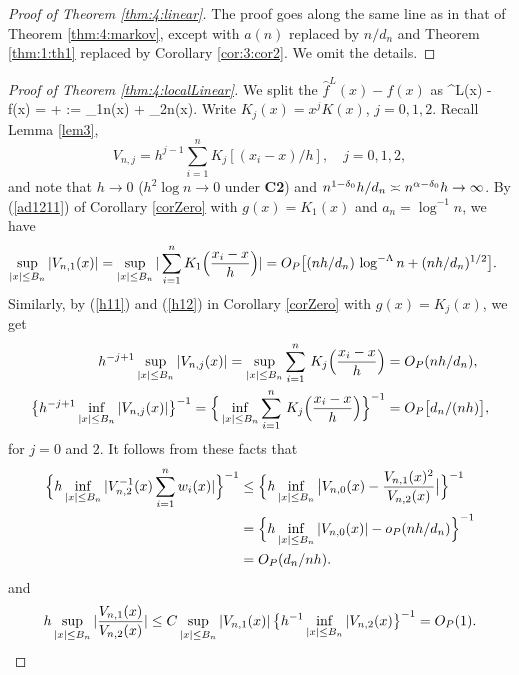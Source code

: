 \begin{proof}[Proof of Theorem \ref{thm:4:linear}]
The proof goes along the same line as in that of Theorem \ref{thm:4:markov}, except with $a(n)$ replaced by $n/d_n$ and Theorem \ref{thm:1:th1} replaced by Corollary \ref{cor:3:cor2}. We omit the details.
\end{proof}

\begin{proof}[Proof of Theorem \ref {thm:4:localLinear}]  We split the $\widehat{f}^L(x)-f(x)$ as
\be
{}^L(x) - f(x) =  +  := \Gamma_{1n}(x)  + \Gamma_{2n}(x). 
\ee
Write $K_j(x) = x^jK(x)$, $j = 0, 1, 2$. Recall Lemma \ref {lem3}, $$V_{n,j}=h^{j-1}
\sum_{i=1}^nK_j[(x_i-x)/h],\quad  j=0,1,2,$$
 and note that   $h\to 0$ ($h^2\log n\to 0$ under {\bf C2}) and $n^{1 - \delta_0} h / d_n \asymp n^{\alpha - \delta_0 } h \to \infty$.
  By (\ref{ad1211}) of Corollary \ref{corZero} with $g(x) = K_1(x)$ and $a_n = \log^{-1}n$, we have
\begin{align}
\sup_{|x| \le B_n} |V_{n,1}(x)| &= \sup_{|x| \le B_n} |\sum_{i = 1}^n K_1 \Big (\frac{x_i - x}{h} \Big )   |  = O_P\big [(nh / d_n)\, \log^{-\Lambda}n + (nh / d_n)^{1/2} \big ]. \nonumber
\end{align}
Similarly, by (\ref{h11}) and (\ref{h12}) in Corollary \ref{corZero} with $g(x) = K_j(x)$, we get
\begin{align}
 h^{-j + 1}\sup_{|x| \le B_n} |V_{n,j}(x)|  =\sup_{|x|\le B_n} \sum_{i=1}^{n}\, K_j\Big (\frac{x_{i}-x}{h}\Big) &= O_P(nh/ d_n), \la{prf.th4.eqn1}\\
\big \{ h^{-j + 1}\inf_{|x| \le B_n} |V_{n,j}(x)| \big \}^{-1} =\Big \{\inf_{|x|\le B_n} \sum_{i=1}^{n}\, K_j\Big (\frac{x_{i}-x}{h}\Big )\Big \}^{-1} &= O_P\big[ d_n / (nh) \big],\la{prf.th4.eqn2}
\end{align}
for $j = 0$ and $ 2$. It follows from these facts  that
\begin{align}
\Big\{h\inf_{|x| \le B_n} | V^{-1}_{n, 2}(x) \sum_{i = 1}^n w_i(x) |\Big\}^{-1} &\le \Big\{h \inf_{|x| \le B_n}  \big |V_{n, 0}(x) - \frac{V_{n, 1}(x)^2}{V_{n,2}(x)} \big | \Big\}^{-1} \no\\
&= \Big\{ h \inf_{|x| \le B_n}  |V_{n, 0}(x)| - o_P(nh/d_n) \Big\}^{-1} \no\\
&= O_P (d_n/nh).\la{prf.th4.eqn3}
\end{align}
and
\begin{align}
h\sup_{|x| \le B_n} | \frac{ V_{n, 1}(x)}{V_{n,2}(x)}|\le C \sup_{|x| \le B_n}|V_{n, 1}(x)| \,\big \{h^{-1} \inf_{|x|\le B_n}|V_{n, 2}(x) \big \}^{-1} = O_P(1).\la{prf.th4.eqn4}

\end{align}
\end{proof}
